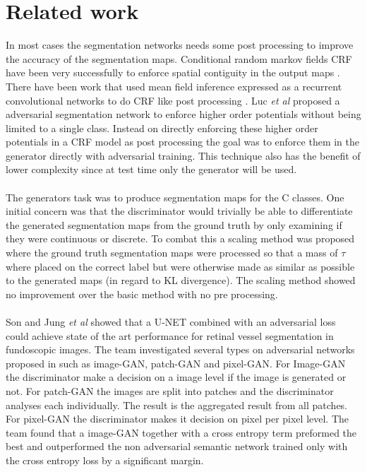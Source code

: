 \documentclass{kththesis}
\begin{document}
\section{Related work}
In most cases the segmentation networks needs some post processing to improve the accuracy of the segmentation maps. Conditional random markov fields CRF have been very successfully to enforce spatial contiguity in the output maps \parencite{arnab_higher_2015, luc_semantic_2016}. There have been work that used mean field inference expressed as a recurrent convolutional networks to do CRF like post processing \parencite{schwing_fully_2015, zheng_conditional_2015}. Luc \textit{et al} \parencite{luc_semantic_2016} proposed a adversarial segmentation network to enforce higher order potentials without being limited to a single class. Instead on directly enforcing these higher order potentials in a CRF model as post processing the goal was to enforce them in the generator directly with adversarial training. This technique also has the benefit of lower complexity since at test time only the generator will be used.\\
\\
The generators task was to produce segmentation maps for the C classes. One initial concern was that the discriminator would trivially be able to differentiate the generated segmentation maps from the ground truth by only examining if they were continuous or discrete. To combat this a scaling method was proposed where the ground truth segmentation maps were processed so that a mass of $\tau$ where placed on the correct label but were otherwise made as similar as possible to the generated maps (in regard to KL divergence). The scaling method showed no improvement over the basic method with no pre processing.\\
\\
Son and Jung \textit{et al} \parencite{son_retinal_2017} showed that a U-NET combined with an adversarial loss could achieve state of the art performance for retinal vessel segmentation in fundoscopic images. The team investigated several types on adversarial networks proposed in \parencite{isola_image--image_2016} such as image-GAN, patch-GAN and pixel-GAN. For Image-GAN the discriminator make a decision on a image level if the image is generated or not. For patch-GAN the images are split into patches and the discriminator analyses each individually. The result is the aggregated result from all patches. For pixel-GAN the discriminator makes it decision on pixel per pixel level. The team found that a image-GAN together with a cross entropy term preformed the best and outperformed the non adversarial semantic network trained only with the cross entropy loss by a significant margin.
\end{document}
